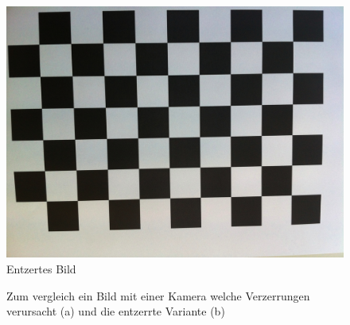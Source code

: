 \begin{figure}[!ht]
\centering
\includegraphics[scale=0.1]{images/chessboard-undisorted.jpg} 
\caption{Entzertes Bild}
\label{fig:chessboard-undisorted}
\end{figure}

\begin{figure}[!ht]
\centering
{}
\caption{Zum vergleich ein Bild mit einer Kamera welche Verzerrungen verursacht (a) und die entzerrte Variante (b)}
\label{fig:calibration}
\end{figure}


